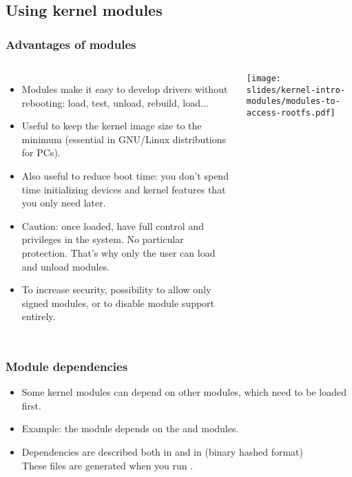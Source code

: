 \subsection{Using kernel modules}

\begin{frame}
  \frametitle{Advantages of modules}
  \begin{columns}
      \begin{itemize}
      \item Modules make it easy to develop drivers without rebooting:
        load, test, unload, rebuild, load...
      \item Useful to keep the kernel image size to the minimum (essential
        in GNU/Linux distributions for PCs).
      \item Also useful to reduce boot time: you don't spend time
        initializing devices and kernel features that you only need later.
      \item Caution: once loaded, have full control and privileges in the
        system. No particular protection. That's why only the  user
        can load and unload modules.
      \item To increase security, possibility to allow only signed modules,
        or to disable module support entirely.
      \end{itemize}
      \texttt{[image: slides/kernel-intro-modules/modules-to-access-rootfs.pdf]}
  \end{columns}
\end{frame}

\begin{frame}
  \frametitle{Module dependencies}
  \begin{itemize}
  \item Some kernel modules can depend on other modules,
    which need to be loaded first.
  \item Example: the  module depends on the
     and  modules.
  \item Dependencies are described
    both in 
    and in  (binary hashed format)\\
    These files are generated when you run .
  \end{itemize}
\end{frame}


